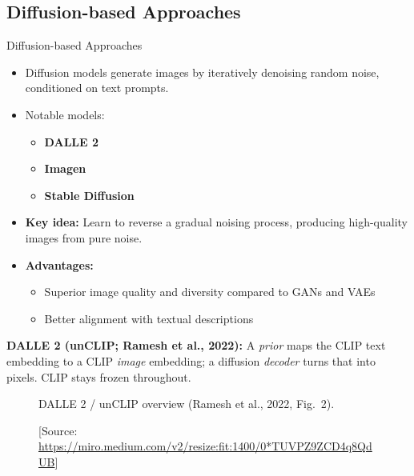 \subsection{Diffusion-based Approaches}
\begin{frame}[allowframebreaks]{Diffusion-based Approaches}
    \begin{itemize}
        \item Diffusion models generate images by iteratively denoising random noise, conditioned on text prompts.
        \item Notable models:
        \begin{itemize}
            \item \textbf{DALL\textbullet E 2}
            \item \textbf{Imagen}
            \item \textbf{Stable Diffusion}
        \end{itemize}
        \item \textbf{Key idea:} Learn to reverse a gradual noising process, producing high-quality images from pure noise.
        \item \textbf{Advantages:}
        \begin{itemize}
            \item Superior image quality and diversity compared to GANs and VAEs
            \item Better alignment with textual descriptions
        \end{itemize}
    \end{itemize}
\framebreak
    \textbf{DALL\textbullet E 2 (unCLIP; Ramesh et al., 2022):} A \emph{prior} maps the CLIP text embedding to a CLIP \emph{image} embedding; a diffusion \emph{decoder} turns that into pixels. CLIP stays frozen throughout.
    \begin{figure}
        \centering
        \caption*{DALL\textbullet E 2 / unCLIP overview (Ramesh et al., 2022, Fig.~2).}
    \end{figure}
\framebreak
    \begin{figure}
        \centering
        \caption*{\scriptsize [Source: \url{https://miro.medium.com/v2/resize:fit:1400/0*TUVPZ9ZCD4q8QdUB}]}

\end{figure}
\end{frame}
